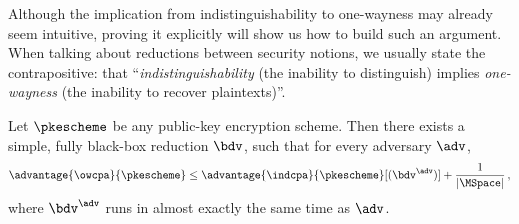   	Although the implication from indistinguishability to one-wayness may already seem intuitive,
  	proving it explicitly will show us how to build such an argument.
    When talking about reductions between security
      notions, we usually state the contrapositive: that
      ``\emph{indistinguishability} (the inability to distinguish) implies
      \emph{one-wayness} (the inability to recover plaintexts)''. 

    \begin{theorem}[IND $\To$ OW]\label{thm:ind-ow-red}
      Let $\pkescheme$ be any public-key encryption scheme. Then there exists a
      simple, fully black-box reduction $\bdv$, such that for every adversary $\adv$,
      \[
        \advantage{\owcpa}{\pkescheme} \leq
        \advantage{\indcpa}{\pkescheme}[(\bdv^{\adv})] + \frac{1}{|\MSpace|}\, ,
      \]
      where $\bdv^{\adv}$ runs in almost exactly the same time as $\adv$.
    \end{theorem}
	

